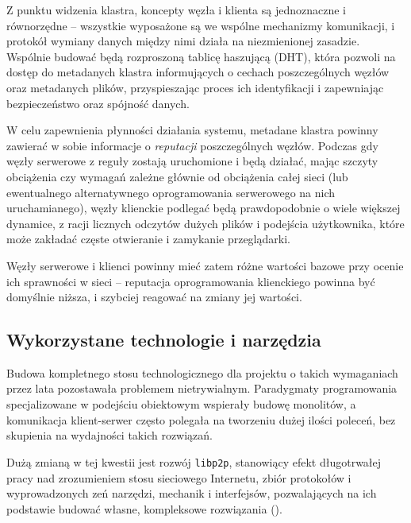 Z punktu widzenia klastra, koncepty węzła i klienta są jednoznaczne i równorzędne -- wszystkie wyposażone są we wspólne mechanizmy komunikacji, i protokół wymiany danych między nimi działa na niezmienionej zasadzie. Wspólnie budować będą rozproszoną tablicę haszującą (DHT), która pozwoli na dostęp do metadanych klastra informujących o cechach poszczególnych węzłów oraz metadanych plików, przyspieszając proces ich identyfikacji i zapewniając bezpieczeństwo oraz spójność danych.


W celu zapewnienia płynności działania systemu, metadane klastra powinny zawierać w sobie informacje o {\em reputacji} poszczególnych węzłów. Podczas gdy węzły serwerowe z reguły zostają uruchomione i będą działać, mając szczyty obciążenia czy wymagań zależne głównie od obciążenia całej sieci (lub ewentualnego alternatywnego oprogramowania serwerowego na nich uruchamianego), węzły klienckie podlegać będą prawdopodobnie o wiele większej dynamice, z racji licznych odczytów dużych plików i podejścia użytkownika, które może zakładać częste otwieranie i zamykanie przeglądarki.

Węzły serwerowe i klienci powinny mieć zatem różne wartości bazowe przy ocenie ich sprawności w sieci -- reputacja oprogramowania klienckiego powinna być domyślnie niższa, i szybciej reagować na zmiany jej wartości.

\subsection{Wykorzystane technologie i narzędzia}
\label{sec:techNTools}

Budowa kompletnego stosu technologicznego dla projektu o takich wymaganiach przez lata pozostawała problemem nietrywialnym. Paradygmaty programowania specjalizowane w podejściu obiektowym wspierały budowę monolitów, a komunikacja klient-serwer często polegała na tworzeniu dużej ilości poleceń, bez skupienia na wydajności takich rozwiązań.

Dużą zmianą w tej kwestii jest rozwój \texttt{libp2p}, stanowiący efekt długotrwałej pracy nad zrozumieniem stosu sieciowego Internetu, zbiór protokołów i wyprowadzonych zeń narzędzi, mechanik i interfejsów, pozwalających na ich podstawie budować własne, kompleksowe rozwiązania (\cite{libp2p-specs}).

